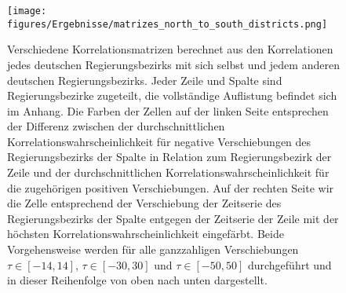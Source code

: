 \begin{figure}[H]
    \centering
    \texttt{[image: figures/Ergebnisse/matrizes\_north\_to\_south\_districts.png]}
    \caption{Verschiedene Korrelationsmatrizen berechnet aus den Korrelationen jedes deutschen Regierungsbezirks mit sich selbst und jedem anderen deutschen Regierungsbezirks. Jeder Zeile und Spalte sind Regierungsbezirke zugeteilt, die vollständige Auflistung befindet sich im Anhang. Die Farben der Zellen auf der linken Seite entsprechen der Differenz zwischen der durchschnittlichen Korrelationswahrscheinlichkeit für negative Verschiebungen des Regierungsbezirks der Spalte in Relation zum Regierungsbezirk der Zeile und der durchschnittlichen Korrelationswahrscheinlichkeit für die zugehörigen positiven Verschiebungen.
    Auf der rechten Seite wir die Zelle entsprechend der Verschiebung der Zeitserie des Regierungsbezirks der Spalte entgegen der Zeitserie der Zeile mit der höchsten Korrelationswahrscheinlichkeit eingefärbt. Beide Vorgehensweise werden für alle ganzzahligen Verschiebungen $\tau\in[-14,14]$,  $\tau\in[-30,30]$ und  $\tau\in[-50,50]$ durchgeführt und in dieser Reihenfolge von oben nach unten dargestellt.}
    \label{fig:matrizes_north_to_south_districts}
\end{figure}
